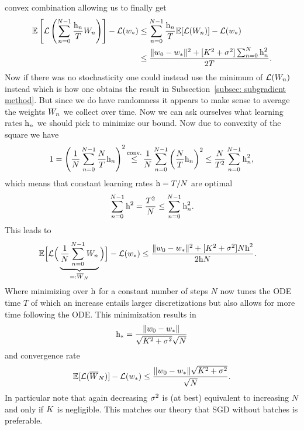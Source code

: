 convex combination allowing us to finally get 
\begin{align*}
	\mathbb{E}\left[\mathcal{L}\left(\sum_{n=0}^{N-1} \frac{\text{h}_n}{T}W_n\right)\right]-\mathcal{L}(w_*)
	&\le \sum_{n=0}^{N-1} \frac{\text{h}_n}{T}\mathbb{E}[\mathcal{L}(W_n)]-\mathcal{L}(w_*)\\
	&\le \frac{
		\|w_0 - w_*\|^2 + [K^2+\sigma^2]\sum_{n=0}^N \text{h}_n^2
	}{
		2T
	}.
\end{align*}
Now if there was no stochasticity one could instead use the minimum of
\(\mathcal{L}(W_n)\) instead which is how one obtains the result in
Subsection~\ref{subsec: subgradient method}. But since we do have randomness
it appears to make sense to average the weights \(W_n\) we collect over
time.
Now we can ask ourselves what learning rates \(\text{h}_n\) we should pick to
minimize our bound. Now due to convexity of the square we have
\begin{align*}
	1 = \left(\frac{1}{N}\sum_{n=0}^{N-1}\frac{N}{T}\lr_n\right)^2
	\xle{\text{conv.}} \frac{1}{N}\sum_{n=0}^{N-1}\left(\frac{N}{T}\lr_n\right)^2
	\le \frac{N}{T^2}\sum_{n=0}^{N-1}\lr_n^2,
\end{align*}
which means that constant learning rates \(\text{h}=T/N\) are optimal
\begin{align*}
	\sum_{n=0}^{N-1}\text{h}^2 = \frac{T^2}{N} \le \sum_{n=0}^{N-1}\text{h}_n^2.
\end{align*}
This leads to
\begin{align*}
	\mathbb{E}\Big[
		\mathcal{L}\Big(\underbrace{
			\frac{1}{N}\sum_{n=0}^{N-1}W_n
		}_{=:\overline{W}_N}\Big)
	\Big]-\mathcal{L}(w_*)
	&\le \frac{
		\|w_0 - w_*\|^2 + [K^2+\sigma^2]N\text{h}^2
	}{2\text{h} N}.
\end{align*}
Where minimizing over \(\text{h}\) for a constant number of steps \(N\) now tunes the
ODE time \(T\) of which an increase entails larger discretizations but also
allows for more time following the ODE.
This minimization results in
\begin{align*}
	\text{h}_* = \frac{\|w_0-w_*\|}{\sqrt{K^2+\sigma^2}\sqrt{N}}
\end{align*}
and convergence rate
\begin{align*}
	\mathbb{E}[\mathcal{L}(\overline{W}_N)] -\mathcal{L}(w_*)
	\le \frac{\|w_0-w_*\|\sqrt{K^2+\sigma^2}}{\sqrt{N}}.
\end{align*}
In particular note that again decreasing \(\sigma^2\) is (at best) equivalent
to increasing \(N\) and only if \(K\) is negligible. This matches our
theory that SGD without batches is preferable.

